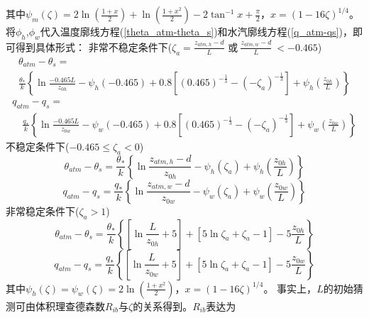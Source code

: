 其中$\psi_m\left(\zeta\right)=2\ln{(\frac{1+x}{2})}+\ln{\left(\frac{1+x^2}{2}\right)-2}\tan^{-1}{x}+\frac{\pi}{2}，x={(1-16\zeta)}^{1/4}$。
将$\phi_h$,$\phi_w$代入温度廓线方程(\ref{theta_atm-theta_s})和水汽廓线方程(\ref{q_atm-qs})，即可得到具体形式：
非常不稳定条件下($\zeta_a=\frac{z_{atm,h}-d}{L}$ 或$ \ \frac{z_{atm,w}-d}{L}\ <-0.465$)
\begin{equation}
\begin{array}{l}\theta_{atm}-\theta_{s}= \\ 
     \frac{\theta_{*}}{k}\left\{\ln \frac{-0.465 L}{z_{0 h}}-\psi_{h}(-0.465)+0.8\left[(0.465)^{-\frac{1}{3}}-\left(-\zeta_{a}\right)^{-\frac{1}{3}}\right]
     +\psi_{h}\left(\frac{z_{0 h}}{L}\right)\right\}\end{array}
\end{equation}
\begin{equation}
\begin{array}{l}q_{atm}-q_{s}= \\ 
     \quad \frac{q_{*}}{k}\left\{\ln \frac{-0.465 L}{z_{0 w}}-\psi_{w}(-0.465)+0.8\left[(0.465)^{-\frac{1}{3}}-
     \left(-\zeta_{a}\right)^{-\frac{1}{3}}\right]+\psi_{w}\left(\frac{z_{0 w}}{L}\right)\right\}\end{array}
\end{equation}
不稳定条件下($-0.465\le\zeta_a<0$)
\begin{equation}
\theta_{atm}-\theta_{s}=\frac{\theta_{*}}{k}\left\{\ln \frac{z_{atm, h}-d}{z_{0 h}}-\psi_{h}
\left(\zeta_{a}\right)+\psi_{h}\left(\frac{z_{0 h}}{L}\right)\right\}
\end{equation}
\begin{equation}
q_{atm}-q_{s}=\frac{q_{*}}{k}\left\{\ln \frac{z_{atm, w}-d}{z_{0 w}}-
\psi_{w}\left(\zeta_{a}\right)+\psi_{w}\left(\frac{z_{0 w}}{L}\right)\right\}
\end{equation}
非常稳定条件下($\zeta_a>1$)
\begin{equation}
\theta_{atm}-\theta_{s}=\frac{\theta_{*}}{k}\left\{\left[\ln \frac{L}{z_{0 h}}+5\right]
+\left[5 \ln \zeta_{a}+\zeta_{a}-1\right]-5 \frac{z_{0 h}}{L}\right\}
\end{equation}
\begin{equation}
q_{atm}-q_{s}=\frac{q_{*}}{k}\left\{\left[\ln \frac{L}{z_{0 w}}+5\right]
+\left[5 \ln \zeta_{a}+\zeta_{a}-1\right]-5 \frac{z_{0 w}}{L}\right\}
\end{equation}
其中$\psi_h\left(\zeta\right)=\psi_w\left(\zeta\right)=2\ln{\left(\frac{1+x^2}{2}\right)}$，$x={(1-16\zeta)}^{1/4}$。
事实上，$L$的初始猜测可由体积理查德森数$R_{ib}$与$\zeta$的关系得到\citep{arya2001introduction}。$R_{ib}$表达为

